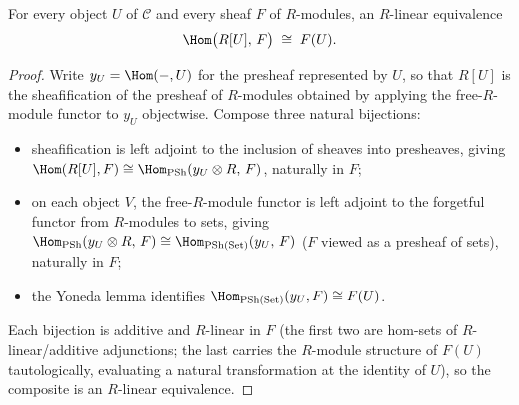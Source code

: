 \begin{definition}
  \label{def:freeModuleSheafHomEquiv}
  \leanok
  For every object \(U\) of \(\mathcal C\) and every sheaf \(F\) of \(R\)-modules, an
  \(R\)-linear equivalence
  \[
    \Hom\bigl(R[U],\, F\bigr) \;\cong\; F(U).
  \]
\end{definition}
\begin{proof}
  \leanok
  Write \(y_U = \Hom(-,U)\) for the presheaf represented by \(U\), so that \(R[U]\) is the
  sheafification of the presheaf of \(R\)-modules obtained by applying the free-\(R\)-module
  functor to \(y_U\) objectwise. Compose three natural bijections:
  \begin{itemize}
    \item sheafification is left adjoint to the inclusion of sheaves into presheaves, giving
      \(\Hom(R[U],F) \cong \Hom_{\mathrm{PSh}}(y_U \otimes R,\, F)\), naturally in \(F\);
    \item on each object \(V\), the free-\(R\)-module functor is left adjoint to the
      forgetful functor from \(R\)-modules to sets, giving
      \(\Hom_{\mathrm{PSh}}(y_U \otimes R,\, F) \cong \Hom_{\mathrm{PSh}(\mathrm{Set})}(y_U,\, F)\)
      (\(F\) viewed as a presheaf of sets), naturally in \(F\);
    \item the Yoneda lemma identifies \(\Hom_{\mathrm{PSh}(\mathrm{Set})}(y_U, F) \cong F(U)\).
  \end{itemize}
  Each bijection is additive and \(R\)-linear in \(F\) (the first two are hom-sets of
  \(R\)-linear/additive adjunctions; the last carries the \(R\)-module structure of \(F(U)\)
  tautologically, evaluating a natural transformation at the identity of \(U\)), so the
  composite is an \(R\)-linear equivalence.
\end{proof}

